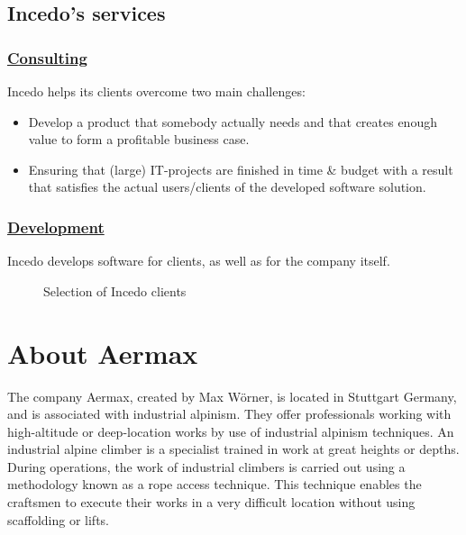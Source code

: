 \subsection{Incedo's services}
\subsubsection*{\underline{Consulting}}
Incedo helps its clients overcome two main challenges:
\begin{itemize}
    \item Develop a product that somebody actually needs and that creates enough value to form a profitable business case.
    \item Ensuring that (large) IT-projects are finished in time \& budget with a result that satisfies the actual users/clients of the developed software solution.
\end{itemize}

\subsubsection*{\underline{Development}}
Incedo develops software for clients, as well as for the company itself.
\begin{figure}[H]
    \centering
    \caption{Selection of Incedo clients}
    \label{fig:selection-of-incedo-clients}
\end{figure}

\section{About Aermax}

The company Aermax, created by Max Wörner, is located in Stuttgart Germany, and is associated with industrial alpinism. They offer professionals working with high-altitude or deep-location works by use of industrial alpinism techniques. An industrial alpine climber is a specialist trained in work at great heights or depths. During operations, the work of industrial climbers is carried out using a methodology known as a rope access technique. This technique enables the craftsmen to execute their works in a very difficult location without using scaffolding or lifts.

